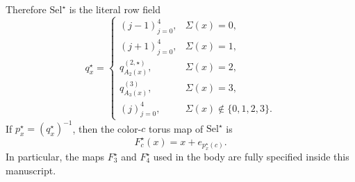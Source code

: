 \documentclass[11pt]{article}
\newcommand{\SelStar}{\mathrm{Sel}^{\star}}
\begin{document}
Therefore \(\SelStar\) is the literal row field
\[
q^\star_x=
\begin{cases}
(j-1)_{j=0}^4, & \Sigma(x)=0,\\
(j+1)_{j=0}^4, & \Sigma(x)=1,\\
q^{(2,\star)}_{A_2(x)}, & \Sigma(x)=2,\\
q^{(3)}_{A_3(x)}, & \Sigma(x)=3,\\
(j)_{j=0}^4, & \Sigma(x)\notin\{0,1,2,3\}.
\end{cases}
\]
If \(p_x^\star=(q_x^\star)^{-1}\), then the color-\(c\) torus map of
\(\SelStar\) is
\[
F_c^\star(x)=x+e_{p_x^\star(c)}.
\]
In particular, the maps \(F_3^\star\) and \(F_4^\star\) used in the body are
fully specified inside this manuscript.
\end{document}
